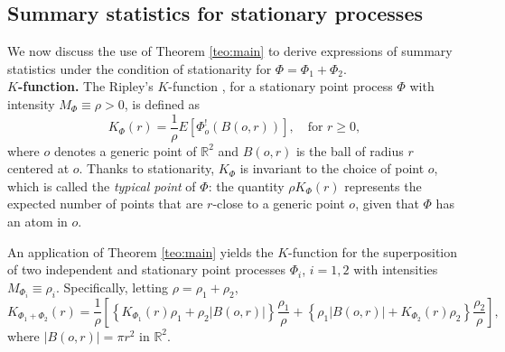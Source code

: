 \documentclass[11pt,a4paper,oneside]{article}
\newcommand{\E}{E}
\newcommand{\R}{\mathbb{R}}
\theoremstyle{definition}
\theoremstyle{remark}
\begin{document}
\subsection{Summary statistics for stationary processes} \label{app:stat_summary}

We now discuss the use of Theorem \ref{teo:main} to derive expressions of summary statistics under the condition of stationarity for $\Phi= \Phi_1+ \Phi_2$.\\

\noindent
\textbf{$K$-function.} The Ripley's $K$-function \citep{ripley1976second}, for a stationary point process $\Phi$ with intensity $M_\Phi \equiv \rho > 0$,  is defined as 
\[
    K_{\Phi}(r) = \frac{1}{\rho} \E[\Phi^!_{o}(B(o,r))], \quad \text{for } r \geq 0,
\]
where $o$ denotes a generic point of $\R^2$ and $B(o, r)$ is the ball of radius $r$ centered at $o$.
Thanks to stationarity, $K_{\Phi}$ is invariant to the choice of point $o$, which is called the \emph{typical point} of $\Phi$: the quantity $\rho K_{\Phi}(r)$ represents the expected number of points that are $r$-close to a generic point $o$, given that $\Phi$ has an atom in $o$.

An application of Theorem \ref{teo:main} yields the $K$-function for the superposition of two independent and stationary point processes $\Phi_i$, $i=1,2$ with intensities $M_{\Phi_i} \equiv \rho_i$. Specifically, letting $\rho = \rho_1 + \rho_2$, 
\begin{equation}\label{eq:Ripley_superposition}
     K_{\Phi_1 + \Phi_2}(r) = \frac{1}{\rho} \left[ \left\{K_{\Phi_1}(r) \rho_1 + \rho_2 |B(o,r)| \right\} \frac{\rho_1}{\rho} +  \left\{ \rho_1 |B(o,r)| + K_{\Phi_2}(r) \rho_2\right\} \frac{\rho_2}{\rho}  \right] ,
\end{equation}
where $|B(o,r)|= \pi r^2$ in $\R^2$.\\
\end{document}
